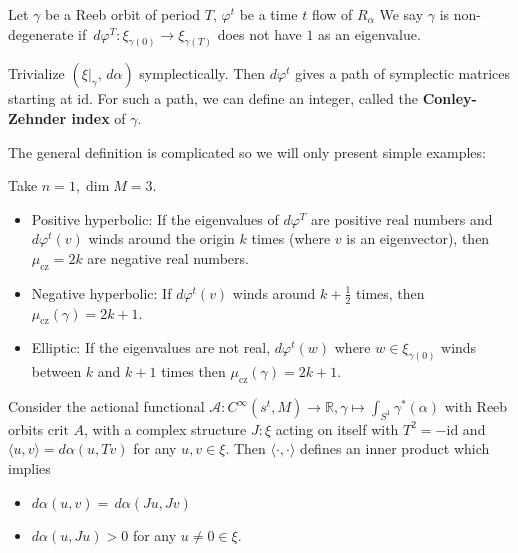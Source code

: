 \begin{definition}

Let $\gamma$ be a Reeb orbit of period $T$, $\varphi^t $ be a time $t$ flow of $R_\alpha$ We say $\gamma$ is non-degenerate if $\,d\varphi^T : \xi_{\gamma(0)}\to \xi_{\gamma(T)}$ does not have $1$ as an eigenvalue.

\end{definition}

\begin{definition}

Trivialize $(\xi|_\gamma, \,d\alpha)$ symplectically. Then $d\varphi^t$ gives a path of symplectic matrices starting at $\text{id}$. For such a path, we can define an integer, called the \textbf{Conley-Zehnder index} of $\gamma$.

\end{definition}

The general definition is complicated so we will only present simple examples:

\begin{example}

Take $n=1, \dim M=3$.
\begin{itemize}
\item Positive hyperbolic: If the eigenvalues of $d\varphi^T$ are positive real numbers and $d\varphi^t(v)$ winds around the origin $k$ times (where $v$ is an eigenvector), then $\mu_{\text{cz}}=2k$ are negative real numbers.
\item Negative hyperbolic: If $d\varphi^t(v)$ winds around $k+\frac{1}{2}$ times, then $\mu_{\text{cz}}(\gamma)=2k+1$.
\item Elliptic: If the eigenvalues are not real, $d\varphi^t (w)$ where $w \in \xi_{\gamma(0)}$ winds between $k$ and $k+1$ times then $\mu_{\text{cz}}(\gamma)=2k+1$.
\end{itemize}

\end{example}

Consider the actional functional $\mathcal{A}:C^\infty(s^t, M)\to \mathbb{R}, \gamma \mapsto \int_{S^1} \gamma^*(\alpha)$ with Reeb orbits $\text{crit }A$, with a complex structure $J:\xi$ acting on itself with $T^2=-\text{id}$ and $\langle u,v \rangle =d\alpha(u, Tv)$ for any $u,v \in \xi$. Then $\langle \cdot, \cdot \rangle$ defines an inner product which implies
\begin{itemize}
\item $d\alpha(u,v) = \,d\alpha(Ju, Jv)$
\item $d\alpha(u, Ju) >0$ for any $u \neq 0 \in \xi$.
\end{itemize}

